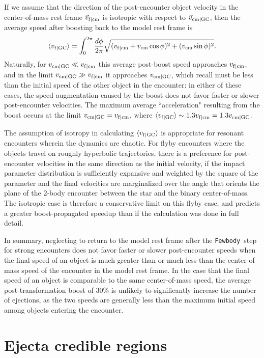 \documentclass[twocolumn]{aastex631}
\newcommand{\fewbody}{\texttt{Fewbody}}
\begin{document}
If we assume that the direction of the post-encounter object velocity in the center-of-mass rest frame $\vec{v}_{\rm f|cm}$ is isotropic with respect to $\vec{v}_{\rm cm|GC}$, then the average speed after boosting back to the model rest frame is
\begin{equation}
    \langle v_{\rm f|GC} \rangle
    = \int_0^{2\pi} \frac{d\phi}{2\pi} \sqrt{(v_{\rm f|cm} + v_{\rm cm} \cos \phi)^2 + (v_{\rm cm} \sin \phi)^2}.
\end{equation}
Naturally, for $v_{\rm cm|GC} \ll v_{\rm f|cm}$ this average post-boost speed approaches $v_{\rm f|cm}$, and in the limit $v_{\rm cm|GC} \gg v_{\rm f|cm}$ it approaches $v_{\rm cm|GC}$, which recall must be less than the initial speed of the other object in the encounter: in either of these cases, the speed augmentation caused by the boost does not favor faster or slower post-encounter velocities.
The maximum average ``acceleration" resulting from the boost occurs at the limit $v_{\rm cm|GC} = v_{\rm f|cm}$, where $\langle v_{\rm f|GC} \rangle \sim 1.3 v_{\rm f|cm} = 1.3 v_{\rm cm|GC}$.

The assumption of isotropy in calculating $\langle v_{\rm f|GC} \rangle$ is appropriate for resonant encounters wherein the dynamics are chaotic.
For flyby encounters where the objects travel on roughly hyperbolic trajectories, there is a preference for post-encounter velocities in the same direction as the initial velocity, if the impact parameter distribution is sufficiently expansive and weighted by the square of the parameter and the final velocities are marginalized over the angle that orients the plane of the 2-body encounter between the star and the binary center-of-mass.
The isotropic case is therefore a conservative limit on this flyby case, and predicts a greater boost-propagated speedup than if the calculation was done in full detail.

In summary, neglecting to return to the model rest frame after the \fewbody\ step for strong encounters does not favor faster or slower post-encounter speeds when the final speed of an object is much greater than or much less than the center-of-mass speed of the encounter in the model rest frame.
In the case that the final speed of an object is comparable to the same center-of-mass speed, the average post-transformation boost of 30\% is unlikely to significantly increase the number of ejections, as the two speeds are generally less than the maximum initial speed among objects entering the encounter.

\section{Ejecta credible regions} \label{app:credreg}
\end{document}
